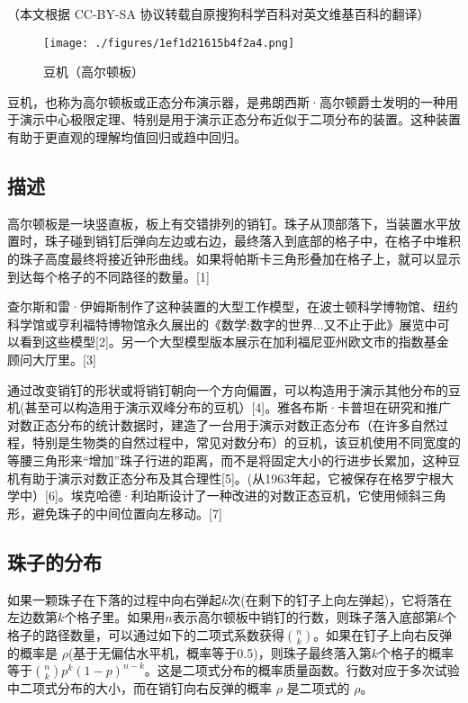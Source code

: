 
（本文根据 CC-BY-SA 协议转载自原搜狗科学百科对英文维基百科的翻译）

\begin{figure}[ht]
\centering
\texttt{[image: ./figures/1ef1d21615b4f2a4.png]}
\caption{豆机（高尔顿板）} \label{fig_GRDDB_1}
\end{figure}

豆机，也称为高尔顿板或正态分布演示器，是弗朗西斯·高尔顿爵士发明的一种用于演示中心极限定理、特别是用于演示正态分布近似于二项分布的装置。这种装置有助于更直观的理解均值回归或趋中回归。

\subsection{描述}

高尔顿板是一块竖直板，板上有交错排列的销钉。珠子从顶部落下，当装置水平放置时，珠子碰到销钉后弹向左边或右边，最终落入到底部的格子中，在格子中堆积的珠子高度最终将接近钟形曲线。如果将帕斯卡三角形叠加在格子上，就可以显示到达每个格子的不同路径的数量。[1]

查尔斯和雷·伊姆斯制作了这种装置的大型工作模型，在波士顿科学博物馆、纽约科学馆或亨利福特博物馆永久展出的《数学:数字的世界...又不止于此》展览中可以看到这些模型[2]。另一个大型模型版本展示在加利福尼亚州欧文市的指数基金顾问大厅里。[3]

通过改变销钉的形状或将销钉朝向一个方向偏置，可以构造用于演示其他分布的豆机(甚至可以构造用于演示双峰分布的豆机）[4]。雅各布斯·卡普坦在研究和推广对数正态分布的统计数据时，建造了一台用于演示对数正态分布（在许多自然过程，特别是生物类的自然过程中，常见对数分布）的豆机，该豆机使用不同宽度的等腰三角形来“增加”珠子行进的距离，而不是将固定大小的行进步长累加，这种豆机有助于演示对数正态分布及其合理性[5]。(从1963年起，它被保存在格罗宁根大学中）[6]。埃克哈德·利珀斯设计了一种改进的对数正态豆机，它使用倾斜三角形，避免珠子的中间位置向左移动。[7]

\subsection{珠子的分布}

如果一颗珠子在下落的过程中向右弹起$k$次(在剩下的钉子上向左弹起)，它将落在左边数第$k$个格子里。如果用$n$表示高尔顿板中销钉的行数，则珠子落入底部第$k$个格子的路径数量，可以通过如下的二项式系数获得$\binom{n}{k}$。如果在钉子上向右反弹的概率是 $\rho$(基于无偏估水平机，概率等于0.5)，则珠子最终落入第$k$个格子的概率等于$\binom{n}{k} p^k (1-p)^{n-k}$。这是二项式分布的概率质量函数。行数对应于多次试验中二项式分布的大小，而在销钉向右反弹的概率 $\rho$ 是二项式的 $\rho$。

